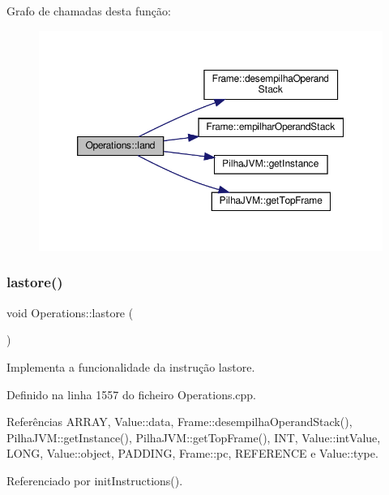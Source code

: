Grafo de chamadas desta função\+:\nopagebreak
\begin{figure}[H]
\begin{center}
\leavevmode
\includegraphics[width=350pt]{classOperations_a6104d728be025abb71570139b988ed4e_cgraph}
\end{center}
\end{figure}
\mbox{\label{classOperations_a562813150c331183212c11e5593b83c6}} 
\subsubsection{\texorpdfstring{lastore()}{lastore()}}
{\footnotesize\ttfamily void Operations\+::lastore (\begin{DoxyParamCaption}{ }\end{DoxyParamCaption})\hspace{0.3cm}{\ttfamily [private]}}



Implementa a funcionalidade da instrução lastore. 



Definido na linha 1557 do ficheiro Operations.\+cpp.



Referências A\+R\+R\+AY, Value\+::data, Frame\+::desempilha\+Operand\+Stack(), Pilha\+J\+V\+M\+::get\+Instance(), Pilha\+J\+V\+M\+::get\+Top\+Frame(), I\+NT, Value\+::int\+Value, L\+O\+NG, Value\+::object, P\+A\+D\+D\+I\+NG, Frame\+::pc, R\+E\+F\+E\+R\+E\+N\+CE e Value\+::type.



Referenciado por init\+Instructions().

